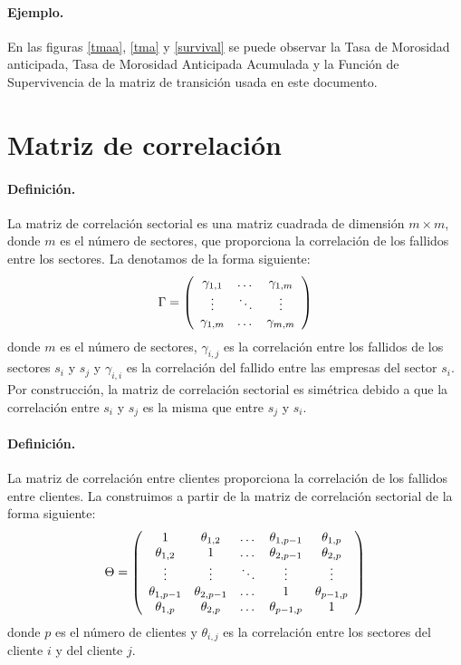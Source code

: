 \paragraph{Ejemplo.} En las figuras \ref{tmaa}, \ref{tma} y \ref{survival} 
se puede observar la Tasa de Morosidad anticipada, Tasa de Morosidad Anticipada 
Acumulada y la Funci\'on de Supervivencia de la matriz de transici\'on usada en 
este documento.


\section{Matriz de correlaci\'on}
\label{sec:mcorrel}

\paragraph{Definici\'on.} La matriz de correlaci\'on sectorial es una matriz
cuadrada de dimensi\'on $m \times m$, donde $m$ es el n\'umero de sectores, 
que proporciona la correlaci\'on de los fallidos entre los sectores. 
La denotamos de la forma siguiente:
\begin{displaymath}
\Gamma = \left(
\begin{array}{ccc}
\gamma_{1,1} & \dots  & \gamma_{1,m} \cr
\vdots & \ddots & \vdots \cr
\gamma_{1,m} & \dots  & \gamma_{m,m} 
\end{array}
\right)
\end{displaymath}
donde $m$ es el n\'umero de sectores, $\gamma_{i,j}$ es la correlaci\'on entre 
los fallidos de los sectores $s_i$ y $s_j$ y $\gamma_{i,i}$ es la correlaci\'on del 
fallido entre las empresas del sector $s_i$. Por construcci\'on, la matriz de 
correlaci\'on sectorial es sim\'etrica debido a que la correlaci\'on entre $s_i$
y $s_j$ es la misma que entre $s_j$ y $s_i$.

\paragraph{Definici\'on.} La matriz de correlaci\'on entre clientes proporciona
la correlaci\'on de los fallidos entre clientes. La construimos a partir de la
matriz de correlaci\'on sectorial de la forma siguiente:
\begin{displaymath}
\Theta = \left(
\begin{array}{ccccc}
1              & \theta_{1,2}   & \dots      & \theta_{1,p-1} & \theta_{1,p}   \cr
\theta_{1,2}   & 1              & \dots      & \theta_{2,p-1} & \theta_{2,p}   \cr
\vdots         & \vdots         & \ddots     & \vdots         & \vdots         \cr
\theta_{1,p-1} & \theta_{2,p-1} & \dots      & 1              & \theta_{p-1,p} \cr
\theta_{1,p}   & \theta_{2,p}   & \dots      & \theta_{p-1,p} & 1
\end{array}
\right)
\end{displaymath}
donde $p$ es el n\'umero de clientes y $\theta_{i,j}$ es la correlaci\'on entre
los sectores del cliente $i$ y del cliente $j$.

